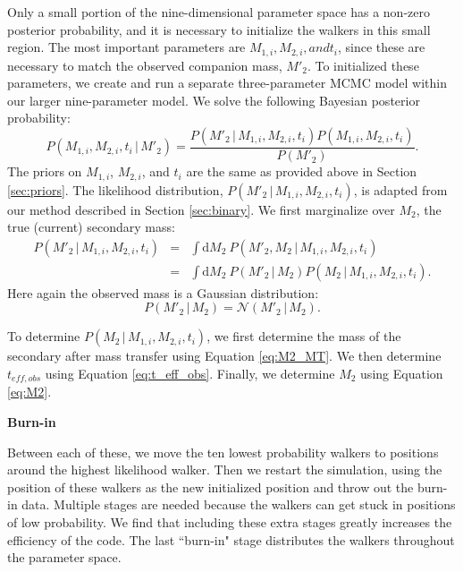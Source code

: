 \documentclass[usenatbib]{mnras}
\newcommand{\given}{\,|\,}
\newcommand{\dd}{\mathrm{d}}
\begin{document}
Only a small portion of the nine-dimensional parameter space has a non-zero posterior probability, and it is necessary to initialize the walkers in this small region. The most important parameters are $M_{1,i}, M_{2,i}, and t_i$, since these are necessary to match the observed companion mass, $M'_2$. To initialized these parameters, we create and run a separate three-parameter MCMC model within our larger nine-parameter model. We solve the following Bayesian posterior probability:
\begin{equation}
P(M_{1,i}, M_{2,i}, t_i \given M'_2) = \frac{ P(M'_2 \given M_{1,i}, M_{2,i}, t_i ) P( M_{1,i}, M_{2,i}, t_i )}{P(M'_2)}.
\end{equation}
The priors on $M_{1,i}$, $M_{2,i}$, and $t_i$ are the same as provided above in Section \ref{sec:priors}. The likelihood distribution, $P(M'_2 \given M_{1,i}, M_{2,i}, t_i )$, is adapted from our method described in Section \ref{sec:binary}. We first marginalize over $M_2$, the true (current) secondary mass:
\begin{eqnarray}
P(M'_2 \given M_{1,i}, M_{2,i}, t_i ) &=& \int \dd M_2\ P(M'_2, M_2 \given M_{1,i}, M_{2,i}, t_i ) \nonumber \\
&=& \int \dd M_2\ P(M'_2 \given M_2) P(M_2 \given M_{1,i}, M_{2,i}, t_i).
\end{eqnarray}
Here again the observed mass is a Gaussian distribution: 
\begin{equation}
P(M'_2 \given M_2) = \mathcal{N}(M'_2 \given M_2).
\end{equation}

To determine $P(M_2 \given M_{1,i}, M_{2,i}, t_i )$, we first determine the mass of the secondary after mass transfer using Equation \ref{eq:M2_MT}. We then determine $t_{eff,obs}$ using Equation \ref{eq:t_eff_obs}. Finally, we determine $M_2$ using Equation \ref{eq:M2}.




{\bf Burn-in}


Between each of these, we move the ten lowest probability walkers to positions around the highest likelihood walker. Then we restart the simulation, using the position of these walkers as the new initialized position and throw out the burn-in data. Multiple stages are needed because the walkers can get stuck in positions of low probability. We find that including these extra stages greatly increases the efficiency of the code. The last ``burn-in" stage distributes the walkers throughout the parameter space. 
\end{document}
